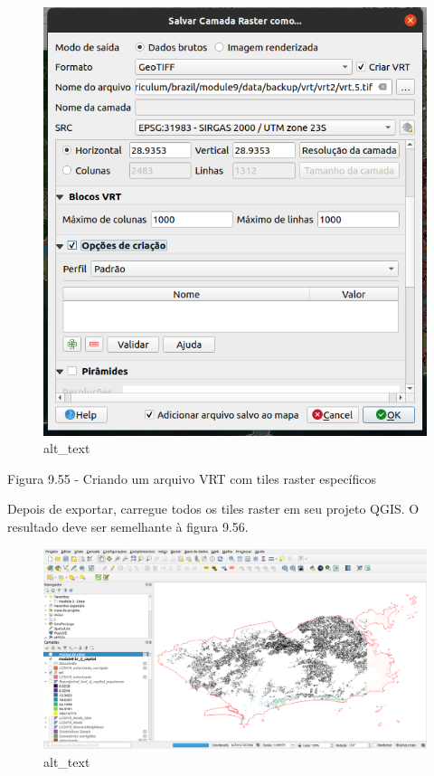 \documentclass[
  portuguese,
]{krantz}
\begin{document}
\begin{figure}
\centering
\includegraphics{media/modulo9/fig955.png}
\caption{alt\_text}
\end{figure}

Figura 9.55 - Criando um arquivo VRT com tiles raster específicos

Depois de exportar, carregue todos os tiles raster em seu projeto QGIS. O resultado deve ser semelhante à figura 9.56.

\begin{figure}
\centering
\includegraphics{media/modulo9/fig956.png}
\caption{alt\_text}
\end{figure}
\end{document}
